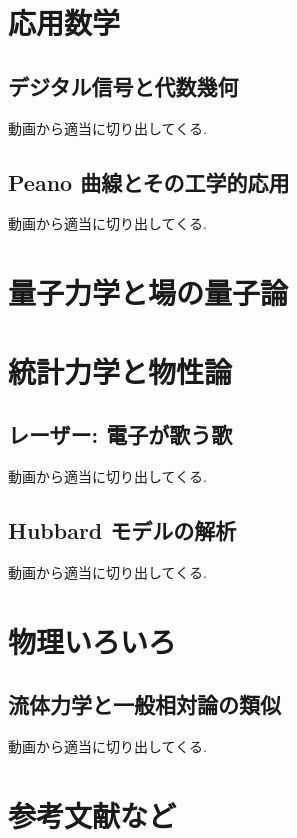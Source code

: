 \documentclass[openany, a4paper, oneside]{book}
\theoremstyle{break}
\theoremstyle{breakdefn}
\begin{document}
\part{応用数学}
\label{sec-12}
\chapter{デジタル信号と代数幾何}
\label{sec-12-1}

動画から適当に切り出してくる.
\chapter{Peano 曲線とその工学的応用}
\label{sec-12-2}

動画から適当に切り出してくる.
\part{量子力学と場の量子論}
\label{sec-13}
\part{統計力学と物性論}
\label{sec-14}
\chapter{レーザー: 電子が歌う歌}
\label{sec-14-1}

動画から適当に切り出してくる.
\chapter{Hubbard モデルの解析}
\label{sec-14-2}

動画から適当に切り出してくる.
\part{物理いろいろ}
\label{sec-15}
\chapter{流体力学と一般相対論の類似}
\label{sec-15-1}

動画から適当に切り出してくる.
\part{参考文献など}
\label{sec-16}

\nocite{*}
\printindex

\end{document}
